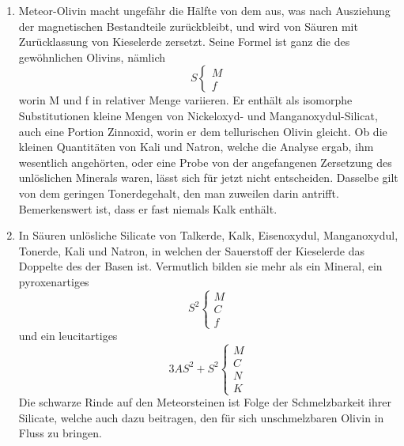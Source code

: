 \documentclass[a4paper, 11pt, oneside]{article}
\begin{document}
\begin{enumerate}
    \item Meteor-Olivin macht ungefähr die Hälfte von dem aus, was nach Ausziehung der magnetischen Bestandteile zurückbleibt, und wird von Säuren mit Zurücklassung von Kieselerde zersetzt. Seine Formel ist ganz die des gewöhnlichen Olivins, nämlich
    \begin{equation*}
        S
        \begin{cases}
          M\\      
          f
        \end{cases}
    \end{equation*}
    worin M und f in relativer Menge variieren. Er enthält als isomorphe Substitutionen kleine Mengen von Nickeloxyd- und Manganoxydul-Silicat, auch eine Portion Zinnoxid, worin er dem tellurischen Olivin gleicht. Ob die kleinen Quantitäten von Kali und Natron, welche die Analyse ergab, ihm wesentlich angehörten, oder eine Probe von der angefangenen Zersetzung des unlöslichen Minerals waren, lässt sich für jetzt nicht entscheiden. Dasselbe gilt von dem geringen Tonerdegehalt, den man zuweilen darin antrifft. Bemerkenswert ist, dass er fast niemals Kalk enthält.
    \item In Säuren unlösliche Silicate von Talkerde, Kalk, Eisenoxydul, Manganoxydul, Tonerde, Kali und Natron, in welchen der Sauerstoff der Kieselerde das Doppelte des der Basen ist. Vermutlich bilden sie mehr als ein Mineral, ein pyroxenartiges
    \begin{equation*}
        S^2
        \begin{cases}
          M\\
          C\\
          f
        \end{cases}
    \end{equation*}
    und ein leucitartiges
    \begin{equation*}
        3AS^2 + S^2
        \begin{cases}
          M\\
          C\\
          N\\
          K
        \end{cases}
    \end{equation*}
    Die schwarze Rinde auf den Meteorsteinen ist Folge der Schmelzbarkeit ihrer Silicate, welche auch dazu beitragen, den für sich unschmelzbaren Olivin in Fluss zu bringen.
        

\end{enumerate}
\end{document}

